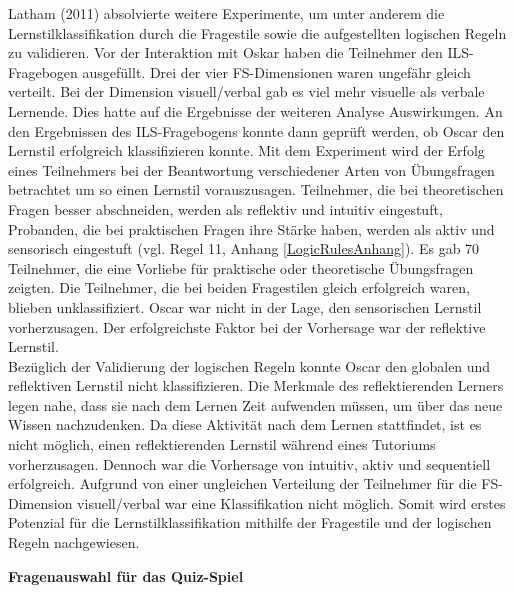 Latham (2011) absolvierte weitere Experimente, um unter anderem die Lernstilklassifikation durch 
die Fragestile sowie die aufgestellten logischen Regeln
zu validieren. Vor der Interaktion mit Oskar haben die Teilnehmer den ILS-Fragebogen 
ausgefüllt. Drei der vier FS-Dimensionen waren ungefähr gleich verteilt. Bei der Dimension visuell/verbal gab es 
viel mehr visuelle als verbale Lernende. Dies hatte auf die Ergebnisse der weiteren Analyse Auswirkungen.
An den Ergebnissen des ILS-Fragebogens konnte dann geprüft werden, ob Oscar den Lernstil erfolgreich klassifizieren konnte. \parencite[118]{Latham.2011}
Mit dem Experiment wird der Erfolg eines Teilnehmers bei der Beantwortung verschiedener Arten von Übungsfragen
betrachtet um so einen Lernstil vorauszusagen. 
Teilnehmer, die bei theoretischen Fragen besser abschneiden, werden als reflektiv und intuitiv eingestuft, Probanden, die
bei praktischen Fragen ihre Stärke haben, werden als aktiv und sensorisch eingestuft (vgl. Regel 11, Anhang \ref{LogicRulesAnhang}).
Es gab 70 Teilnehmer, die eine Vorliebe für praktische oder theoretische
Übungsfragen zeigten. Die Teilnehmer, die bei beiden Fragestilen gleich erfolgreich waren, blieben unklassifiziert.
Oscar  war nicht in der Lage, den sensorischen Lernstil vorherzusagen. Der erfolgreichste Faktor bei der Vorhersage
war der reflektive Lernstil. \parencite[123]{Latham.2011} \\
Bezüglich der Validierung der logischen Regeln konnte Oscar den globalen und reflektiven Lernstil nicht klassifizieren.
Die Merkmale des reflektierenden Lerners legen nahe, dass sie nach dem Lernen Zeit aufwenden müssen, um über
das neue Wissen nachzudenken.
Da diese Aktivität nach dem Lernen stattfindet, ist es nicht möglich, einen reflektierenden Lernstil während eines Tutoriums vorherzusagen.
Dennoch war die Vorhersage von intuitiv, aktiv und sequentiell erfolgreich. Aufgrund von einer ungleichen Verteilung der Teilnehmer 
für die FS-Dimension visuell/verbal war eine Klassifikation nicht möglich. \parencite[121 f.]{Latham.2011}
Somit wird erstes Potenzial für die Lernstilklassifikation mithilfe der Fragestile und der logischen Regeln nachgewiesen.

\textbf{Fragenauswahl für das Quiz-Spiel}\label{Fragenauswahl}

